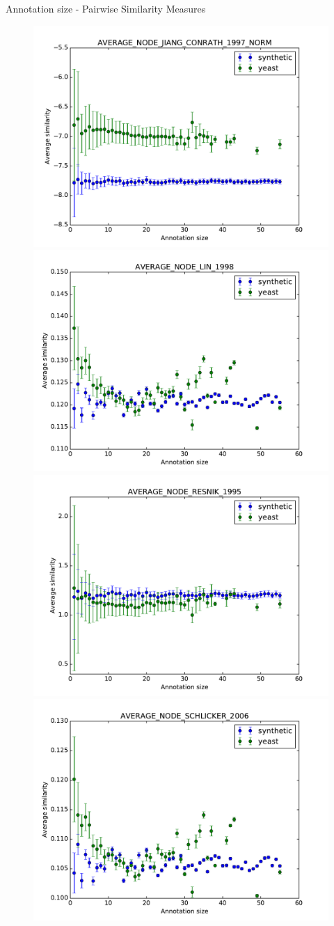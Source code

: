 \documentclass{beamer}
\begin{document}
\begin{frame}{Annotation size - Pairwise Similarity Measures}
\begin{figure}
\includegraphics[width=0.5\linewidth, height=0.4\textheight]{pairwise/SIM_GROUPWISE_AVERAGE_SIM_PAIRWISE_DAG_NODE_JIANG_CONRATH_1997_NORM_avg.pdf}
\includegraphics[width=0.5\linewidth, height=0.4\textheight]{pairwise/SIM_GROUPWISE_AVERAGE_SIM_PAIRWISE_DAG_NODE_LIN_1998_avg.pdf} \\
\includegraphics[width=0.5\linewidth, height=0.4\textheight]{pairwise/SIM_GROUPWISE_AVERAGE_SIM_PAIRWISE_DAG_NODE_RESNIK_1995_avg.pdf}
\includegraphics[width=0.5\linewidth, height=0.4\textheight]{pairwise/SIM_GROUPWISE_AVERAGE_SIM_PAIRWISE_DAG_NODE_SCHLICKER_2006_avg.pdf}
\end{figure}
\end{frame}
\end{document}
